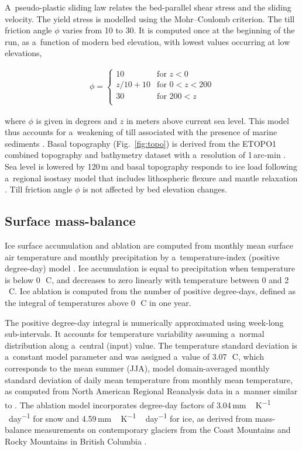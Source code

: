 \documentclass[tc, ms]{copernicus}
\begin{document}
A~pseudo-plastic sliding law \citep{aschwanden-etal-2013} relates the bed-parallel shear stress and the sliding velocity. The yield stress is modelled using the Mohr--Coulomb criterion. The till friction angle $\phi$ varies from 10 to 30{\degree}. It is computed once at the beginning of the run, as a~function of modern bed elevation, with lowest values occurring at low elevations,

\begin{align}
  \phi =
  \begin{cases}
    10      & \text{for }       z<  0 \\
    z/10+10 & \text{for }    0 <z<200 \\
    30      & \text{for }  200 <z     \\
  \end{cases}
\end{align}

where $\phi$ is given in degrees and $z$ in meters above current sea level. This model thus accounts for a~weakening of till associated with the presence of marine sediments \citep{martin-etal-2011,aschwanden-etal-2013}. Basal topography (Fig.~\ref{fig:topo}) is derived from the ETOPO1 combined topography and bathymetry dataset with a~resolution of 1\,arc-min \citep{data:etopo1}. Sea level is lowered by 120\,m and basal topography responds to ice load following a~regional isostasy model that includes lithospheric flexure and mantle relaxation \citep{lingle-clark-1985}. Till friction angle $\phi$ is not affected by bed elevation changes.

\subsection{Surface mass-balance}

Ice surface accumulation and ablation are computed from monthly mean surface air temperature and monthly precipitation by a~temperature-index (positive degree-day) model \citep{hock-2003}. Ice accumulation is equal to precipitation when temperature is below 0\,\unit{{\degree}C}, and decreases to zero linearly with temperature between 0 and 2\,\unit{{\degree}C}. Ice ablation is computed from the number of positive degree-days, defined as the integral of temperatures above 0\,\unit{{\degree}C} in one year. 

The positive degree-day integral \citep{calov-greve-2005} is numerically approximated using week-long sub-intervals. It accounts for temperature variability assuming a~normal distribution along a~central (input) value. The temperature standard deviation is a~constant model parameter and was assigned a~value of 3.07\,\unit{{\degree}C}, which corresponds to the mean summer (JJA), model domain-averaged monthly standard deviation of daily mean temperature from monthly mean temperature, as computed from North American Regional Reanalysis data \citep{data:narr} in a~manner similar to \citet{seguinot-2013}. The ablation model incorporates degree-day factors of 3.04\,\unit{mm\,K^{-1}\,day^{-1}} for snow and 4.59\,\unit{mm\,K^{-1}\,day^{-1}} for ice, as derived from mass-balance measurements on contemporary glaciers from the Coast Mountains and Rocky Mountains in British Columbia \citep{shea-etal-2009}.
\end{document}
